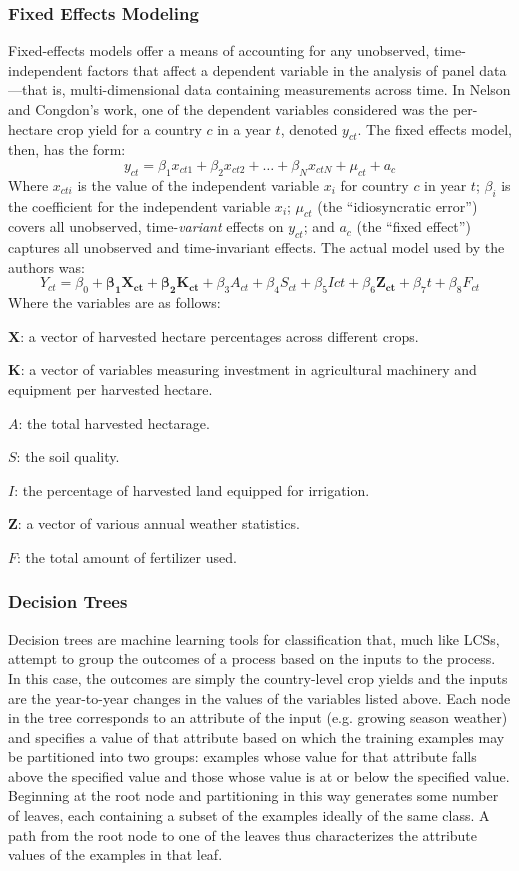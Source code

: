 \documentclass[11pt]{article}
\begin{document}
\subsubsection{Fixed Effects Modeling}
Fixed-effects models offer a means of accounting for any unobserved, time-independent factors that affect a dependent variable in the analysis of panel data---that is, multi-dimensional data containing measurements across time. In Nelson and Congdon's work, one of the dependent variables considered was the per-hectare crop yield for a country $c$ in a year $t$, denoted $y_{ct}$. The fixed effects model, then, has the form:
$$y_{ct} = \beta_1x_{ct1} + \beta_2x_{ct2} + \ldots + \beta_Nx_{ctN} + \mu_{ct} + a_c$$
Where $x_{cti}$ is the value of the independent variable $x_i$ for country $c$ in year $t$; $\beta_i$ is the coefficient for the independent variable $x_i$; $\mu_{ct}$ (the ``idiosyncratic error'') covers all unobserved, time-\emph{variant} effects  on $y_{ct}$; and $a_c$ (the ``fixed effect'') captures all unobserved and time-invariant effects. The actual model used by the authors was:
$$Y_{ct} = \beta_0 + \pmb{\beta_1}\pmb{X_{ct}} + \pmb{\beta_2}\pmb{K_{ct}} + \beta_3A_{ct} + \beta_4S_{ct} + \beta_5I{ct} + \beta_6\pmb{Z_{ct}} + \beta_7t + \beta_8F_{ct}$$
Where the variables are as follows:
\begin{description}
\item $\pmb{X}$: a vector of harvested hectare percentages across different crops.
\item $\pmb{K}$: a vector of variables measuring investment in agricultural machinery and equipment per harvested hectare.
\item $A$: the total harvested hectarage.
\item $S$: the soil quality.
\item $I$: the percentage of harvested land equipped for irrigation.
\item $\pmb{Z}$: a vector of various annual weather statistics.
\item $F$: the total amount of fertilizer used.
\end{description}
\subsubsection{Decision Trees}

Decision trees are machine learning tools for classification that, much like LCSs, attempt to group the outcomes of a process based on the inputs to the process. In this case, the outcomes are simply the country-level crop yields and the inputs are the year-to-year changes in the values of the variables listed above. Each node in the tree corresponds to an attribute of the input (e.g. growing season weather) and specifies a value of that attribute based on which the training examples may be partitioned into two groups: examples whose value for that attribute falls above the specified value and those whose value is at or below the specified value. Beginning at the root node and partitioning in this way generates some number of leaves, each containing a subset of the examples ideally of the same class. A path from the root node to one of the leaves thus characterizes the attribute values of the examples in that leaf.
\end{document}
